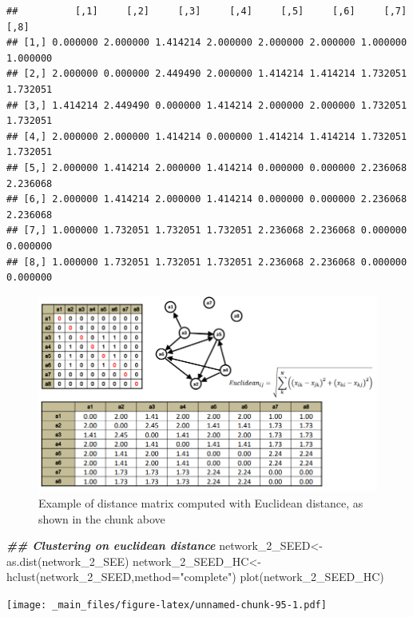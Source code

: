 \documentclass[
  notitlepage,
  onecolumn,
  openany]{book}
\newenvironment{Shaded}{\begin{snugshade}}{\end{snugshade}}
\newcommand{\AttributeTok}[1]{\textcolor[rgb]{0.77,0.63,0.00}{#1}}
\newcommand{\DocumentationTok}[1]{\textcolor[rgb]{0.56,0.35,0.01}{\textbf{\textit{#1}}}}
\newcommand{\FunctionTok}[1]{\textcolor[rgb]{0.00,0.00,0.00}{#1}}
\newcommand{\NormalTok}[1]{#1}
\newcommand{\OtherTok}[1]{\textcolor[rgb]{0.56,0.35,0.01}{#1}}
\newcommand{\StringTok}[1]{\textcolor[rgb]{0.31,0.60,0.02}{#1}}
\begin{document}
\begin{verbatim}
##          [,1]     [,2]     [,3]     [,4]     [,5]     [,6]     [,7]     [,8]
## [1,] 0.000000 2.000000 1.414214 2.000000 2.000000 2.000000 1.000000 1.000000
## [2,] 2.000000 0.000000 2.449490 2.000000 1.414214 1.414214 1.732051 1.732051
## [3,] 1.414214 2.449490 0.000000 1.414214 2.000000 2.000000 1.732051 1.732051
## [4,] 2.000000 2.000000 1.414214 0.000000 1.414214 1.414214 1.732051 1.732051
## [5,] 2.000000 1.414214 2.000000 1.414214 0.000000 0.000000 2.236068 2.236068
## [6,] 2.000000 1.414214 2.000000 1.414214 0.000000 0.000000 2.236068 2.236068
## [7,] 1.000000 1.732051 1.732051 1.732051 2.236068 2.236068 0.000000 0.000000
## [8,] 1.000000 1.732051 1.732051 1.732051 2.236068 2.236068 0.000000 0.000000
\end{verbatim}

\begin{figure}[h!]

{\centering \includegraphics[width=0.7\linewidth]{images/11-Subgroups and Structural Equivalence/Untitled 10} 

}

\caption{Example of distance matrix computed with Euclidean distance, as shown in the chunk above}\label{fig:unnamed-chunk-94}
\end{figure}

\begin{Shaded}
\begin{Highlighting}[]
\DocumentationTok{\#\# Clustering on euclidean distance}
\NormalTok{network\_2\_SEED}\OtherTok{\textless{}{-}}\FunctionTok{as.dist}\NormalTok{(network\_2\_SEE)}
\NormalTok{network\_2\_SEED\_HC}\OtherTok{\textless{}{-}}\FunctionTok{hclust}\NormalTok{(network\_2\_SEED,}\AttributeTok{method=}\StringTok{"complete"}\NormalTok{)}
\FunctionTok{plot}\NormalTok{(network\_2\_SEED\_HC)}
\end{Highlighting}
\end{Shaded}

\texttt{[image: \_main\_files/figure-latex/unnamed-chunk-95-1.pdf]}
\end{document}
